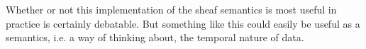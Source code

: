 \documentclass[CT4S-EN-RU]{subfiles}
\begin{document}
\begin{exampleRUS}
\end{exampleRUS}

\begin{blockENG}
Whether or not this implementation of the sheaf semantics is most useful in practice is certainly debatable. But something like this could easily be useful as a semantics, i.e. a way of thinking about, the temporal nature of data.
\end{blockENG}

\begin{blockRUS}
\end{blockRUS}
\end{document}
